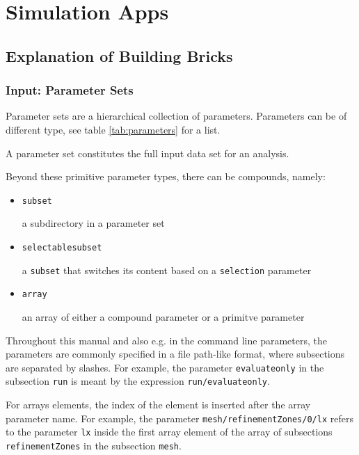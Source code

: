 \section{Simulation Apps}

\subsection{Explanation of Building Bricks}

\subsubsection{Input: Parameter Sets}
\label{sec:parametersets}

Parameter sets are a hierarchical collection of parameters. Parameters can be of different type, see table \ref{tab:parameters} for a list.

A parameter set constitutes the full input data set for an analysis.

Beyond these primitive parameter types, there can be compounds, namely:
\begin{itemize}
\item \texttt{subset}

a subdirectory in a parameter set

\item \texttt{selectablesubset}

a \texttt{subset} that switches its content based on a \texttt{selection} parameter

\item \texttt{array}

an array of either a compound parameter or a primitve parameter
\end{itemize}

Throughout this manual and also e.g. in the command line parameters, the parameters are commonly specified in a file path-like format, where subsections are separated by slashes.
For example, the parameter \texttt{evaluateonly} in the subsection \texttt{run} is meant by the expression \texttt{run/evaluateonly}.

For arrays elements, the index of the element is inserted after the array parameter name. For example, the parameter \texttt{mesh/refinementZones/0/lx} refers to the parameter \texttt{lx} inside the first array element of the array of subsections \texttt{refinementZones} in the subsection \texttt{mesh}.

